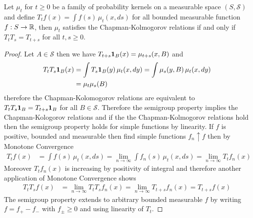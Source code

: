 \begin{prop}\label{SemigroupsAndChapmanKolmogorov}Let $\mu_t$ for $t \geq 0$ be a family of probability kernels on a measurable space $(S, \mathcal{S})$ and define 
$T_t f(x) = \int f(s) \, \mu_t(x, ds)$ for all bounded measurable function $f : S \to \mathbb{R}$, then $\mu_t$ satisfies the Chapman-Kolmogorov relations if and only
if $T_t T_s = T_{t + s}$ for all $t,s \geq 0$.
\end{prop}
\begin{proof}
Let $A \in \mathcal{S}$ then we have $T_{t+s} \textbf{1}_{B}(x) =  \mu_{t+s} (x, B)$ and
\begin{align*}
T_t T_s \textbf{1}_{B} (x) &= \int T_s \textbf{1}_{B} (y) \, \mu_t(x, dy) =\int \mu_s(y, B) \, \mu_t(x, dy) \\
&= \mu_t \mu_s (B)
\end{align*}
therefore the Chapman-Kolomogorov relations are equivalent to $T_t T_s \textbf{1}_{B} = T_{t+s} \textbf{1}_{B}$ for all $B \in \mathcal{S}$.  Therefore the semigroup property implies the Chapman-Kologorov relations and if the the Chapman-Kolmogorov relations hold then the semigroup property holds for simple functions by linearity.   If $f$ is positive, bounded and measurable then find simple functions $f_n \uparrow f$ then by Monotone Convergence 
\begin{align*}
T_t f(x) &= \int f(s) \, \mu_t(x, ds) = \lim_{n \to \infty} \int f_n(s) \, \mu_t(x, ds) = \lim_{n \to \infty} T_t f_n(x)
\end{align*}
Moreover $T_t f_n (x)$ is increasing by positivity of integral and therefore another application of Monotone Convergence shows
\begin{align*}
T_t T_s f(x) &= \lim_{n \to \infty} T_t T_s f_n (x) = \lim_{n \to \infty} T_{t + s} f_n (x) = T_{t+s} f(x)
\end{align*}
The semigroup property extends to arbitrary bounded measurable $f$ by writing $f = f_+ - f_-$ with $f_\pm \geq 0$ and using linearity of $T_t$.
\end{proof}

